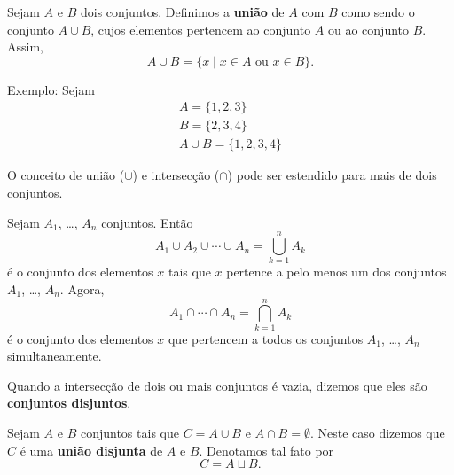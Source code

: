 \begin{definicao}[Uni{\~a}o]
Sejam $A$ e $B$ dois conjuntos. Definimos a \textbf{uni{\~a}o} de $A$ com $B$ como sendo o conjunto $A \cup B$, cujos elementos pertencem ao conjunto $A$ ou ao conjunto $B$. Assim,
\[
A \cup B = \{x \mid x \in A \mbox{ ou } x \in B\}.
\]
\end{definicao}

Exemplo: Sejam
\begin{align*}
	A = \{1,2,3\}\\
	B = \{2,3,4\}\\
	A \cup B = \{1,2,3,4\}
\end{align*}

O conceito de uni{\~a}o ($ \cup $) e intersec{\c c}{\~a}o ($ \cap $) pode ser estendido para mais de dois conjuntos.

\begin{definicao}
Sejam $A_{1}$, \dots, $A_{n}$ conjuntos. Ent{\~a}o
\[
A_{1} \cup A_{2} \cup \cdots \cup A_{n}= \displaystyle\bigcup_{k=1}^n A_{k}
\]
{\'e} o conjunto dos elementos $x$ tais que $x$ pertence a pelo menos um dos conjuntos $A_{1}$, \dots, $A_{n}$. Agora,
\[
A_{1} \cap \cdots \cap A_{n} = \displaystyle\bigcap_{k=1}^{n}A_{k}
\]
{\'e} o conjunto dos elementos $x$ que pertencem a todos os conjuntos $A_{1}$, \dots, $A_{n}$ simultaneamente.
\end{definicao}

Quando a intersec{\c c}{\~a}o de dois ou mais conjuntos {\'e} vazia, dizemos que eles s{\~a}o \textbf{conjuntos disjuntos}.

Sejam $A$ e $B$ conjuntos tais que $C = A \cup B$ e $A \cap B = \emptyset$. Neste caso dizemos que $C$ {\'e} uma \textbf{uni{\~a}o disjunta} de $A$ e $B$. Denotamos tal fato por
\[
C = A \sqcup B.
\]

